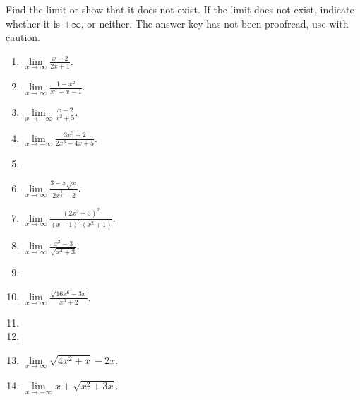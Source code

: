 Find the limit or show that it does not exist. If the limit does not exist, indicate whether it is $\pm\infty$, or neither. The answer key has not been proofread, use with caution.
\begin{multicols}{3}
\begin{enumerate}[ref={\fcProblemRef}]
\item $\displaystyle \lim\limits_{x\to\infty }\frac{x-2}{2x+1}$.

\item $\displaystyle \lim\limits_{x\to\infty }\frac{1-x^2}{x^3-x-1}$.

\item $\displaystyle \lim\limits_{x\to-\infty }\frac{x-2}{x^2+5}$.

\item \label{problemlimxtominusinfty(3x^3+2)/(2x^3-4x+5)} $\displaystyle \lim\limits_{x\to-\infty }\frac{3x^3+2}{2x^3-4x+5}$.

\item 
\item $\displaystyle \lim\limits_{x\to\infty }\frac{3-x\sqrt{x}}{2x^{\frac{3}{2}}-2}$.

\item $\displaystyle \lim\limits_{x\to\infty }\frac{(2x^2+3)^2}{(x-1)^2(x^2+1)}$.

\item $\displaystyle \lim\limits_{x\to\infty }\frac{x^2-3}{\sqrt{x^4+3}}$.


\item 


\item $\displaystyle \lim\limits_{x\to\infty }\frac{\sqrt{16x^6-3x}}{x^3+2}$.

\item 
\item 
\item $\displaystyle \lim\limits_{x\to\infty}\sqrt{4x^2+x}-2x$.

\item $\displaystyle \lim\limits_{x\to-\infty} x+\sqrt{x^2+3x} $.


\end{enumerate}
\end{multicols}
